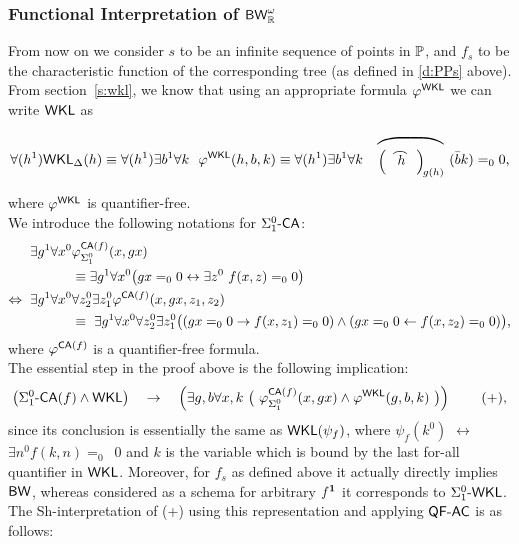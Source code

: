 \subsubsection*{Functional Interpretation of $\textsf{\upshape BW}^\omega_{\mathbb{R}}$} \label{ss:fafi}

From now on we consider $s$ to be an infinite sequence of points
in $\mathbb{P}$, and $f_s$ to be the characteristic function of
the corresponding tree (as defined in \ref{d:PPs} above).
From section~\ref{s:wkl}, we know that using an 
appropriate formula $\varphi^{\textsf{\upshape WKL}}$
we can write $\textsf{\upshape WKL}$ as
\[
\forall(h^1)\WKL_\Delta(h)
\equiv
\forall (h^1)\exists b^1\forall k\ \ \phi^{\WKL}(h,b,k)
\equiv
\forall(h^1)\exists b^1\forall k\ \ 
\widefr{\Big(\!\text{\widefr{h}}\Big)_{\!g(h)}} (\bar bk)=_00
\text{,}
\]
where $\varphi^{\textsf{\upshape WKL}}$ is quantifier-free.\\
We introduce the following notations for $\Sigma^0_1\textsf{\upshape -}\textsf{\upshape CA}$:
\begin{align*}
\exists g^1\forall x^0 &\phi^{\CA(f)}_{\Sigma^0_1}(x,gx)\\
  &\equiv \exists g^1\forall x^0 \big(gx=_00 \leftrightarrow 
            \exists z^0\ f(x,z)=_00\big)\\
\Leftrightarrow\ 
\exists g^1\forall x^0 &\forall z^0_2\exists z^0_1 
\phi^{\CA(f)}(x,gx,z_1,z_2)\\
&\equiv\
\exists g^1\forall x^0\forall z^0_2\exists z^0_1
   \big((gx=_00 \rightarrow f(x,z_1)=_00)\wedge(gx=_00 \leftarrow 
f(x,z_2)=_00) \big)
\text{,}
\end{align*}
where $\varphi^{\textsf{\upshape CA}(f)}$ is a quantifier-free formula. \\
The essential step in the proof above is the following implication:
\[ \big(\Sigma^0_1\textsf{\upshape -}\textsf{\upshape CA}(f) \wedge \textsf{\upshape WKL}\big)\quad \rightarrow\quad 
  \Big( 
   \exists g,b\forall x,k\ \big(\ \varphi^{\textsf{\upshape CA}(f)}_{\Sigma^0_1}(x,gx)\wedge 
\varphi^{\textsf{\upshape WKL}}(g,b,k)\ \big) 
   \Big)\  
\tag{+}\text{,} \]
since its conclusion is essentially the same as
$\textsf{\upshape WKL}(\psi_f)$, where
$\psi_f(k^0)$  $\leftrightarrow$ $\exists n^0 f(k,n)\!=_0$~$\!0$
and $k$ is the variable which is bound by the last for-all quantifier in 
$\textsf{\upshape WKL}$.
Moreover, for $f_s$ as defined above it actually directly implies $\textsf{\upshape BW}$, 
whereas 
considered as a schema for arbitrary $f^\mathbf{1}$ it corresponds to $\Sigma^0_1\textsf{\upshape -}\textsf{\upshape WKL}$.\\
The Sh-interpretation of (+) using this representation and applying $\textsf{\upshape QF-}\textsf{\upshape AC}$ 
is as follows:
